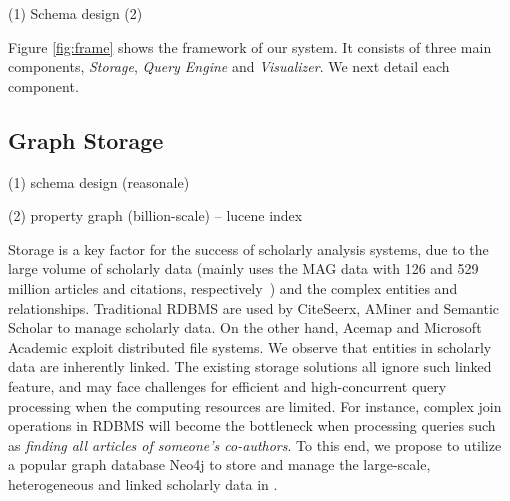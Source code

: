 (1) Schema design
(2)


Figure \ref{fig:frame} shows the framework of our \oursystem system. It consists of three main components, \emph{Storage}, \emph{Query Engine} and \emph{Visualizer}. We next detail each component.






\subsection{Graph Storage}


(1) schema design (reasonale)

(2) property graph (billion-scale) -- lucene index

Storage is a key factor for the success of scholarly analysis systems, due to the large volume of scholarly data (\eg \oursystem mainly uses the MAG data with 126 and 529 million articles and citations, respectively~\cite{sinha2015overview}) and the complex entities and relationships.
%
Traditional RDBMS are used by CiteSeerx, AMiner and Semantic Scholar to manage scholarly data. On the other hand, Acemap and Microsoft Academic exploit distributed file systems.
%
We observe that entities in scholarly data are inherently linked. The existing storage solutions all ignore such linked feature, and may face challenges for efficient and high-concurrent query processing when the computing resources are limited. For instance, complex join operations in RDBMS will become the bottleneck when processing queries such as {\em finding all articles of someone's co-authors}.
%
To this end, we propose to utilize a popular graph database Neo4j to store and manage the large-scale, heterogeneous and linked scholarly data in \oursystem.

